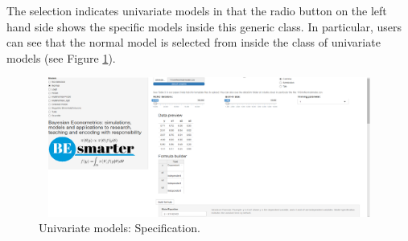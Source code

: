 The selection indicates univariate models in that the radio button on the left hand side shows the specific models inside this generic class. In particular, users can see that the normal model is selected from inside the class of univariate models (see Figure \ref{fig62}).

\begin{figure}
	\includegraphics[width=340pt, height=130pt]{Chapters/chapterGUI/figures/Figure2.png}
	\caption[List of figure caption goes here]{Univariate models: Specification.}\label{fig62}
\end{figure}


